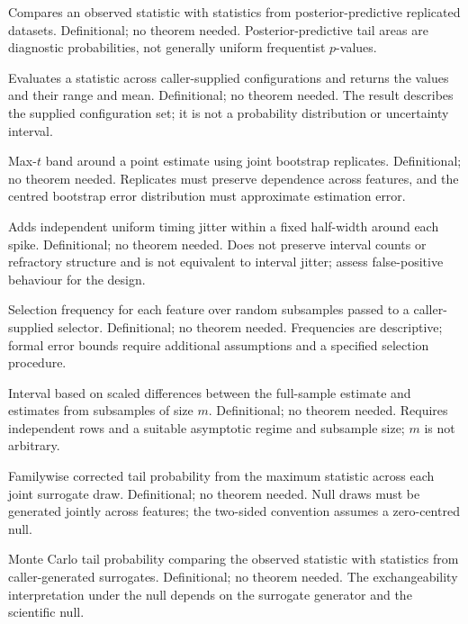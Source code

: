 {Compares an observed statistic with statistics from posterior-predictive replicated datasets.}
{Definitional; no theorem needed.}
{Posterior-predictive tail areas are diagnostic probabilities, not generally uniform frequentist $p$-values.}

{Evaluates a statistic across caller-supplied configurations and returns the values and their range and mean.}
{Definitional; no theorem needed.}
{The result describes the supplied configuration set; it is not a probability distribution or uncertainty interval.}

{Max-$t$ band around a point estimate using joint bootstrap replicates.}
{Definitional; no theorem needed.}
{Replicates must preserve dependence across features, and the centred bootstrap error distribution must approximate estimation error.}

{Adds independent uniform timing jitter within a fixed half-width around each spike.}
{Definitional; no theorem needed.}
{Does not preserve interval counts or refractory structure and is not equivalent to interval jitter; assess false-positive behaviour for the design.}

{Selection frequency for each feature over random subsamples passed to a caller-supplied selector.}
{Definitional; no theorem needed.}
{Frequencies are descriptive; formal error bounds require additional assumptions and a specified selection procedure.}

{Interval based on scaled differences between the full-sample estimate and estimates from subsamples of size $m$.}
{Definitional; no theorem needed.}
{Requires independent rows and a suitable asymptotic regime and subsample size; $m$ is not arbitrary.}

{Familywise corrected tail probability from the maximum statistic across each joint surrogate draw.}
{Definitional; no theorem needed.}
{Null draws must be generated jointly across features; the two-sided convention assumes a zero-centred null.}

{Monte Carlo tail probability comparing the observed statistic with statistics from caller-generated surrogates.}
{Definitional; no theorem needed.}
{The exchangeability interpretation under the null depends on the surrogate generator and the scientific null.}

